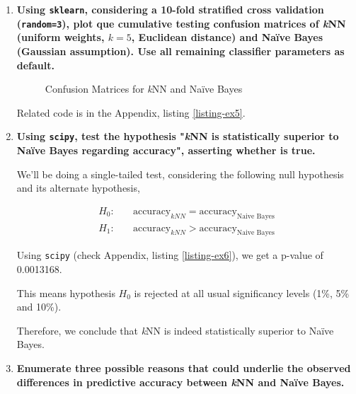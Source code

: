 \documentclass[12pt]{article}
\begin{document}
\begin{enumerate}[leftmargin=\labelsep,resume]
    \item {\bfseries
          Using \texttt{sklearn}, considering a 10-fold stratified cross validation
          (\texttt{random=3}), plot que cumulative testing confusion matrices of
          \textit{k}NN (uniform weights, $k = 5$, Euclidean distance) and Naïve Bayes
          (Gaussian assumption). Use all remaining classifier parameters as default.
          }

          \begin{figure}[H]
              \centering
              
              \caption{Confusion Matrices for \textit{k}NN and Naïve Bayes}
              \label{fig:confusion-matrices}
          \end{figure}

          Related code is in the Appendix, listing \ref{listing-ex5}.

    \item {\bfseries
          Using \texttt{scipy}, test the hypothesis "\textit{k}NN is statistically
          superior to Naïve Bayes regarding accuracy", asserting whether is true.
          }

          We'll be doing a single-tailed test, considering the following null
          hypothesis and its alternate hypothesis,

          $$
              \begin{aligned}
                  H_0: & \quad\text{accuracy}_{kNN} = \text{accuracy}_{\text{Naive Bayes}} \\
                  H_1: & \quad\text{accuracy}_{kNN} > \text{accuracy}_{\text{Naive Bayes}}
              \end{aligned}
          $$

          Using \texttt{scipy} (check Appendix, listing \ref{listing-ex6}), we get a p-value of 0.0013168.

          This means hypothesis $H_0$ is rejected at all usual significancy levels
          (1\%, 5\% and 10\%).

          Therefore, we conclude that \textit{k}NN is indeed statistically superior
          to Naïve Bayes.

    \item {\bfseries
          Enumerate three possible reasons that could underlie the observed differences in predictive accuracy between \textit{k}NN and Naïve
          Bayes.
          }


\end{enumerate}
\end{document}
